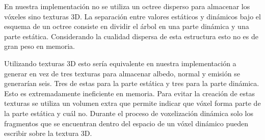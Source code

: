 En nuestra implementación no se utiliza un octree disperso para almacenar los vóxeles sino texturas 3D. La separación entre valores estáticos y dinámicos bajo el esquema de un octree consiste en dividir el árbol en una parte dinámica y una parte estática. Considerando la cualidad dispersa de esta estructura esto no es de gran peso en memoria. 

Utilizando texturas 3D esto sería equivalente en nuestra implementación a generar en vez de tres texturas para almacenar albedo, normal y emisión se generarían seis. Tres de estas para la parte estática y tres para la parte dinámica. Esto es extremadamente ineficiente en memoria. Para evitar la creación de estas texturas se utiliza un volumen extra que permite indicar que vóxel forma parte de la parte estática y cuál no. Durante el proceso de voxelización dinámica solo los fragmentos que se encuentran dentro del espacio de un vóxel dinámico pueden escribir sobre la textura 3D.

